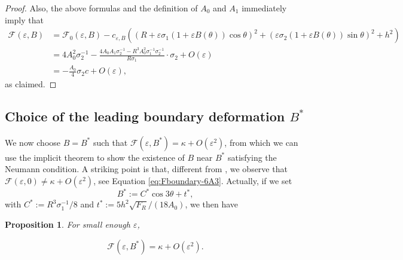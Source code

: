 \documentclass[12pt,reqno]{amsart}
\numberwithin{equation}{section}
\newtheorem{proposition}[theorem]{Proposition}
\theoremstyle{definition}
\theoremstyle{remark}
\begin{document}
\begin{proof}
	Also, the above formulas and the definition of $ A_0 $ and $ A_1 $ immediately imply that
	\begin{align*}
	\mathcal{F}(\varepsilon,B)
	&= 	\mathcal{F}_0(\varepsilon,B)
	- c_{\varepsilon,B} \left( (R+\varepsilon\sigma_1(1+\varepsilon B(\theta))\cos\theta)^2+(\varepsilon\sigma_2(1+\varepsilon B(\theta))\sin\theta)^2+h^2\right)   \\
	&= 4 A_0^2\sigma_2^{-1}-\frac{4A_0A_1\sigma_2^{-1}-R^3A_0^2\sigma_1^{-1}\sigma_2^{-1}}{R\sigma_1}\cdot \sigma_2 + O(\varepsilon) \\
	&=-\frac{A_0}{4}\sigma_2c + O(\varepsilon),
	\end{align*}
	as claimed.
 
\end{proof}
 

\subsection{Choice of the leading boundary deformation $ B^* $}
We now choose $ B=B^* $ such that $ \mathcal{F}(\varepsilon,B^*)= \kappa+O(\varepsilon^2) $, from which we can use the implicit theorem to show the existence of $ B $ near $ B^* $ satisfying the Neumann condition. A striking point is that, different from \cite{DominguezVazquezEncisoPeraltaSalas2021}, we observe that $ \mathcal{F}(\varepsilon,0)\neq \kappa+O(\varepsilon^2) $, see  Equation \eqref{eq:Fboundary-6A3}. Actually, if we set
$$B^*:=C^*\cos3\theta+t^*,$$
with $ C^*:=R^3\sigma_1^{-1}/8 $ and $ t^*:=5h^2\sqrt{F_R}/(18A_0) $,
we then have 
\begin{proposition}\label{prop:choice of B_0}
 	For small enough $\varepsilon$,
 
	\[
	\mathcal{F}(\varepsilon,B^*) = \kappa + O(\varepsilon^2).
	\]
	
\end{proposition}
\end{document}
